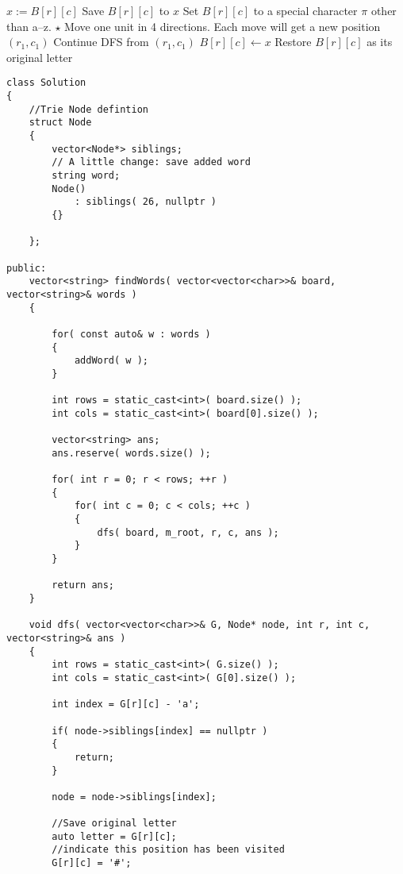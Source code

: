 \begin{algorithm}[H]
\begin{algorithmic}[1]
\State $x:=B[r][c]$ \Comment Save $B[r][c]$ to $x$
\State Set $B[r][c]$ to a special character $\pi$ other than a--z.
\State $\star$ Move one unit in 4 directions. Each move will get a new position $(r_1, c_1)$
\State {} \Comment Continue DFS from $(r_1,c_1)$
\EndIf
\State $B[r][c]\gets x$ \Comment Restore $B[r][c]$ as its original letter
\EndFunction
\end{algorithmic}
\end{algorithm}
\setcounter{lstlisting}{0}
\begin{lstlisting}[style=customc, caption={DFS And Trie}]
class Solution
{
	//Trie Node defintion
    struct Node
    {
        vector<Node*> siblings;
		// A little change: save added word
        string word;
        Node()
            : siblings( 26, nullptr )
        {}

    };

public:
    vector<string> findWords( vector<vector<char>>& board, vector<string>& words )
    {

        for( const auto& w : words )
        {
            addWord( w );
        }

        int rows = static_cast<int>( board.size() );
        int cols = static_cast<int>( board[0].size() );

        vector<string> ans;
        ans.reserve( words.size() );

        for( int r = 0; r < rows; ++r )
        {
            for( int c = 0; c < cols; ++c )
            {
                dfs( board, m_root, r, c, ans );
            }
        }

        return ans;
    }

    void dfs( vector<vector<char>>& G, Node* node, int r, int c, vector<string>& ans )
    {
        int rows = static_cast<int>( G.size() );
        int cols = static_cast<int>( G[0].size() );

        int index = G[r][c] - 'a';

        if( node->siblings[index] == nullptr )
        {
            return;
        }

        node = node->siblings[index];

		//Save original letter 
        auto letter = G[r][c];
		//indicate this position has been visited
        G[r][c] = '#'; 


\end{lstlisting}
